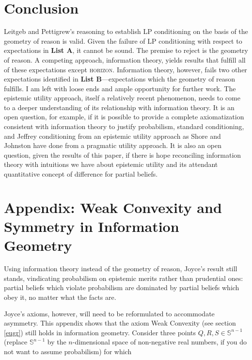 \documentclass[11pt]{article}
\begin{document}
\section{Conclusion}
\label{ascc}

Leitgeb and Pettigrew's reasoning to establish LP conditioning on the
basis of the geometry of reason is valid. Given the failure of LP
conditioning with respect to expectations in \textbf{List A}, it cannot be
sound. The premise to reject is the geometry of reason. A competing
approach, information theory, yields results that fulfill all of these
expectations except \textsc{horizon}. Information theory, however,
fails two other expectations identified in \textbf{List B}---expectations
which the geometry of reason fulfills. I am left with loose ends and
ample opportunity for further work. The epistemic utility approach,
itself a relatively recent phenomenon, needs to come to a deeper
understanding of its relationship with information theory. It is an
open question, for example, if it is possible to provide a complete
axiomatization consistent with information theory to justify
probabilism, standard conditioning, and Jeffrey conditioning from an
epistemic utility approach as Shore and Johnston have done from a
pragmatic utility approach. It is also an open question, given the
results of this paper, if there is hope reconciling information theory
with intuitions we have about epistemic utility and its attendant
quantitative concept of difference for partial beliefs.

\appendix

\section{Appendix: Weak Convexity and Symmetry in Information Geometry}
\label{app:wcs}

Using information theory instead of the geometry of reason, Joyce's
result still stands, vindicating probabilism on epistemic merits
rather than prudential ones: partial beliefs which violate probabilism
are dominated by partial beliefs which obey it, no matter what the
facts are.

Joyce's axioms, however, will need to be reformulated to accommodate
asymmetry. This appendix shows that the axiom Weak Convexity (see
section \ref{eugr}) still holds in information geometry. Consider
three points $Q,R,S\in\mathbb{S}^{n-1}$ (replace $\mathbb{S}^{n-1}$ by the
$n$-dimensional space of non-negative real numbers, if you do not want
to assume probabilism) for which
\end{document}
